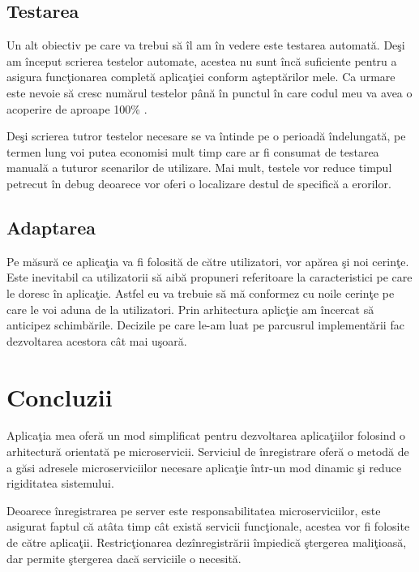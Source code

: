 \documentclass[a4paper,12pt]{report}
\begin{document}
\section{Testarea }

Un alt obiectiv pe care va trebui s\u a \^il am \^in vedere este testarea automat\u a.
De\c si am \^inceput scrierea testelor automate, acestea nu sunt \^inc\u a suficiente pentru 
a asigura func\c tionarea complet\u a aplica\c tiei conform a\c stept\u arilor mele.
Ca urmare este nevoie s\u a cresc num\u arul testelor p\^an\u a \^in punctul \^in care 
codul meu va avea o acoperire de aproape 100\% .

De\c si scrierea tutror testelor necesare 
se va \^intinde pe o perioad\u a \^indelungat\u a, pe termen lung voi putea economisi mult timp
care ar fi consumat de testarea manual\u a a tuturor scenarilor de utilizare. Mai mult,
testele vor reduce timpul petrecut \^in debug deoarece vor oferi o localizare destul de specific\u a
a erorilor. 

\section{Adaptarea}

Pe m\u asur\u a ce aplica\c tia va fi folosit\u a de c\u atre utilizatori, 
vor ap\u area \c si noi cerin\c te. Este inevitabil ca utilizatorii 
s\u a aib\u a propuneri referitoare la caracteristici pe care le doresc 
\^in aplica\c tie. Astfel eu va trebuie s\u a m\u a conformez cu noile 
cerin\c te pe care le voi aduna de la utilizatori. Prin arhitectura aplic\c tie 
am \^incercat s\u a anticipez schimb\u arile. Decizile pe care le-am luat pe parcusrul 
implement\u arii  fac dezvoltarea acestora 
c\^at mai u\c soar\u a.

\chapter{Concluzii}

Aplica\c tia mea ofer\u a un mod simplificat pentru dezvoltarea aplica\c tiilor 
folosind o arhitectur\u a orientat\u a pe microservicii.
Serviciul de \^inregistrare ofer\u a o metod\u a de a g\u asi adresele microserviciilor necesare aplica\c tie 
\^intr-un mod dinamic \c si reduce rigiditatea sistemului.

Deoarece \^inregistrarea pe server este responsabilitatea microserviciilor, 
este asigurat faptul c\u a at\^ata timp c\^at exist\u a servicii func\c tionale,
acestea vor fi folosite de c\u atre aplica\c tii. Restric\c tionarea dez\^inregistr\u arii
\^impiedic\u a \c stergerea mali\c tioas\u a, dar permite \c stergerea dac\u a serviciile 
o necesit\u a.
\end{document}
